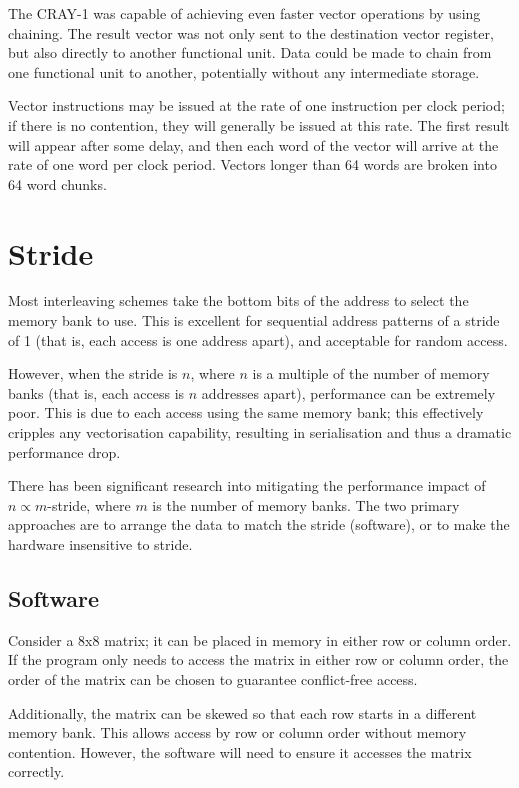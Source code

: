 The CRAY-1 was capable of achieving even faster vector operations by using chaining. The result vector was not only sent to the destination vector register, but also directly to another functional unit. Data could be made to chain from one functional unit to another, potentially without any intermediate storage.

Vector instructions may be issued at the rate of one instruction per clock period; if there is no contention, they will generally be issued at this rate. The first result will appear after some delay, and then each word of the vector will arrive at the rate of one word per clock period. Vectors longer than 64 words are broken into 64 word chunks.

\section{Stride}
\label{sec:stride}
Most interleaving schemes take the bottom bits of the address to select the memory bank to use. This is excellent for sequential address patterns of a stride of 1 (that is, each access is one address apart), and acceptable for random access.

However, when the stride is $n$, where $n$ is a multiple of the number of memory banks (that is, each access is $n$ addresses apart), performance can be extremely poor. This is due to each access using the same memory bank; this effectively cripples any vectorisation capability, resulting in serialisation and thus a dramatic performance drop.

There has been significant research into mitigating the performance impact of $n \propto m$-stride, where $m$ is the number of memory banks. The two primary approaches are to arrange the data to match the stride (software), or to make the hardware insensitive to stride.

\subsection{Software}
Consider a 8x8 matrix; it can be placed in memory in either row or column order. If the program only needs to access the matrix in either row or column order, the order of the matrix can be chosen to guarantee conflict-free access.

Additionally, the matrix can be skewed so that each row starts in a different memory bank. This allows access by row or column order without memory contention. However, the software will need to ensure it accesses the matrix correctly.

